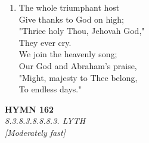 \begin{enumerate}
    \item The whole triumphant host \\
        Give thanks to God on high; \\
        "Thrice holy Thou, Jehovah God," \\
        They ever cry. \\
        We join the heavenly song; \\
        Our God and Abraham's praise, \\
        "Might, majesty to Thee belong, \\
        To endless days."

\end{enumerate}

\newpage
\begin{center}
    {\Large \textbf{HYMN 162}}
    \\
    \textit{8.3.8.3.8.8.8.3. LYTH}
    \\
    \textit{\small [Moderately fast]}
\end{center}
\vspace{1em}

